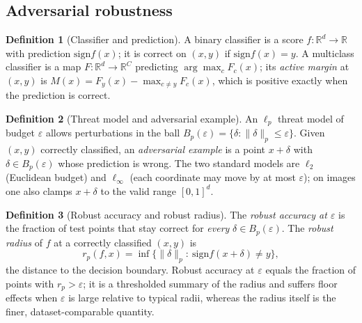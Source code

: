 \documentclass[11pt]{article}
\theoremstyle{plain}
\theoremstyle{definition}
\newtheorem{definition}{Definition}
\theoremstyle{remark}
\newcommand{\R}{\mathbb{R}}
\newcommand{\sign}{\mathrm{sign}}
\begin{document}
\subsection{Adversarial robustness}\label{sec:background-rob}
\begin{definition}[Classifier and prediction]
A binary classifier is a score $f:\R^d\to\R$ with prediction $\sign f(x)$; it is correct on $(x,y)$ if $\sign f(x)=y$.  A multiclass classifier is a map $F:\R^d\to\R^C$ predicting $\arg\max_c F_c(x)$; its \emph{active margin} at $(x,y)$ is $M(x)=F_y(x)-\max_{c\ne y}F_c(x)$, which is positive exactly when the prediction is correct.
\end{definition}

\begin{definition}[Threat model and adversarial example]
An $\ell_p$ threat model of budget $\varepsilon$ allows perturbations in the ball $B_p(\varepsilon)=\{\delta:\|\delta\|_p\le\varepsilon\}$.  Given $(x,y)$ correctly classified, an \emph{adversarial example} is a point $x+\delta$ with $\delta\in B_p(\varepsilon)$ whose prediction is wrong.  The two standard models are $\ell_2$ (Euclidean budget) and $\ell_\infty$ (each coordinate may move by at most $\varepsilon$); on images one also clamps $x+\delta$ to the valid range $[0,1]^d$.
\end{definition}

\begin{definition}[Robust accuracy and robust radius]\label{def:robust}
The \emph{robust accuracy at $\varepsilon$} is the fraction of test points that stay correct for \emph{every} $\delta\in B_p(\varepsilon)$.  The \emph{robust radius} of $f$ at a correctly classified $(x,y)$ is
\[
r_p(f,x)=\inf\{\|\delta\|_p:\ \sign f(x+\delta)\ne y\},
\]
the distance to the decision boundary.  Robust accuracy at $\varepsilon$ equals the fraction of points with $r_p>\varepsilon$; it is a thresholded summary of the radius and suffers floor effects when $\varepsilon$ is large relative to typical radii, whereas the radius itself is the finer, dataset-comparable quantity.
\end{definition}
\end{document}
